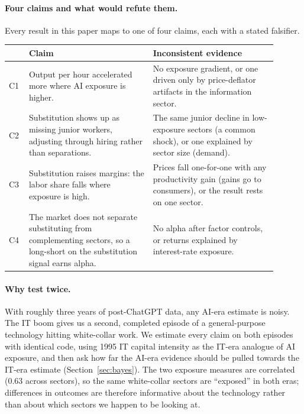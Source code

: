 \paragraph{Four claims and what would refute them.} Every result in this paper maps to one of four claims, each with a stated falsifier.

\begin{singlespace}
\small
\begin{center}
\begin{tabular}{p{0.06\linewidth}p{0.42\linewidth}p{0.42\linewidth}}
\toprule
 & Claim & Inconsistent evidence \\
\midrule
C1 & Output per hour accelerated more where AI exposure is higher. & No exposure gradient, or one driven only by price-deflator artifacts in the information sector. \\
C2 & Substitution shows up as missing junior workers, adjusting through hiring rather than separations. & The same junior decline in low-exposure sectors (a common shock), or one explained by sector size (demand). \\
C3 & Substitution raises margins: the labor share falls where exposure is high. & Prices fall one-for-one with any productivity gain (gains go to consumers), or the result rests on one sector. \\
C4 & The market does not separate substituting from complementing sectors, so a long-short on the substitution signal earns alpha. & No alpha after factor controls, or returns explained by interest-rate exposure. \\
\bottomrule
\end{tabular}
\end{center}
\end{singlespace}

\paragraph{Why test twice.} With roughly three years of post-ChatGPT data, any AI-era estimate is noisy. The IT boom gives us a second, completed episode of a general-purpose technology hitting white-collar work. We estimate every claim on both episodes with identical code, using 1995 IT capital intensity as the IT-era analogue of AI exposure, and then ask how far the AI-era evidence should be pulled towards the IT-era estimate (Section~\ref{sec:bayes}). The two exposure measures are correlated (0.63 across sectors), so the same white-collar sectors are ``exposed'' in both eras; differences in outcomes are therefore informative about the technology rather than about which sectors we happen to be looking at.
